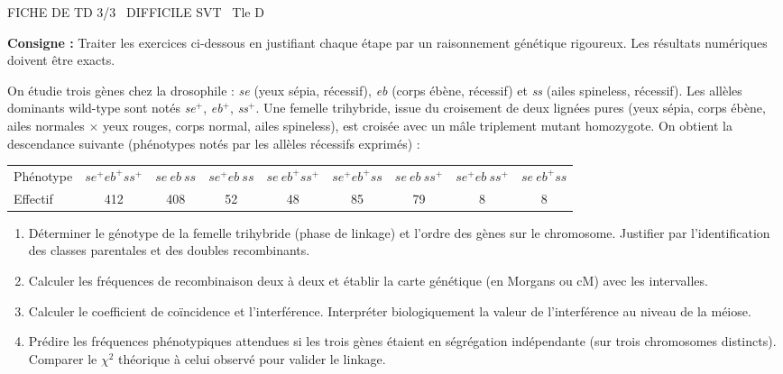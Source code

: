 \documentclass[11pt]{article}
\begin{document}
\begin{tcolorbox}[enhanced,colback=popink,colframe=popink,arc=10pt,boxrule=0pt,left=12pt,right=12pt,top=9pt,bottom=9pt]
{\color{white}\popxbold\small FICHE DE TD 3/3 \textbullet\ DIFFICILE \hfill SVT \textbullet\ Tle D\par}
\end{tcolorbox}
\vspace{4pt}
\noindent \textbf{Consigne :} Traiter les exercices ci-dessous en justifiant chaque étape par un raisonnement génétique rigoureux. Les résultats numériques doivent être exacts.

\begin{exercice}
On étudie trois gènes chez la drosophile : \textit{se} (yeux sépia, récessif), \textit{eb} (corps ébène, récessif) et \textit{ss} (ailes spineless, récessif). Les allèles dominants wild-type sont notés \textit{se$^+$}, \textit{eb$^+$}, \textit{ss$^+$}.
Une femelle trihybride, issue du croisement de deux lignées pures (yeux sépia, corps ébène, ailes normales $\times$ yeux rouges, corps normal, ailes spineless), est croisée avec un mâle triplement mutant homozygote.
On obtient la descendance suivante (phénotypes notés par les allèles récessifs exprimés) :
\begin{center}
\begin{tabular}{lcccccccc}
\hline
Phénotype & $se^+ eb^+ ss^+$ & $se\ eb\ ss$ & $se^+ eb\ ss$ & $se\ eb^+ ss^+$ & $se^+ eb^+ ss$ & $se\ eb\ ss^+$ & $se^+ eb\ ss^+$ & $se\ eb^+ ss$ \\
Effectif & 412 & 408 & 52 & 48 & 85 & 79 & 8 & 8 \\
\hline
\end{tabular}
\end{center}
\begin{enumerate}
\item Déterminer le génotype de la femelle trihybride (phase de linkage) et l'ordre des gènes sur le chromosome. Justifier par l'identification des classes parentales et des doubles recombinants.
\item Calculer les fréquences de recombinaison deux à deux et établir la carte génétique (en Morgans ou cM) avec les intervalles.
\item Calculer le coefficient de coïncidence et l'interférence. Interpréter biologiquement la valeur de l'interférence au niveau de la méiose.
\item Prédire les fréquences phénotypiques attendues si les trois gènes étaient en ségrégation indépendante (sur trois chromosomes distincts). Comparer le $\chi^2$ théorique à celui observé pour valider le linkage.
\end{enumerate}
\end{exercice}
\end{document}
